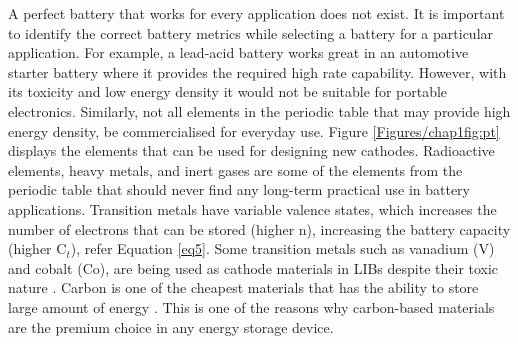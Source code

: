 A perfect battery that works for every application does not exist. It is important to identify the correct battery metrics while selecting a battery for a particular application. For example, a lead-acid battery works great in an automotive starter battery where it provides the required high rate capability. However, with its toxicity and low energy density it would not be suitable for portable electronics. Similarly, not all elements in the periodic table that may provide high energy density, be commercialised for everyday use. Figure \ref{Figures/chap1fig:pt} displays the elements that can be used for designing new cathodes. Radioactive elements, heavy metals, and inert gases are some of the elements from the periodic table that should never find any long-term practical use in battery applications. Transition metals have variable valence states, which increases the number of electrons that can be stored (higher n), increasing the battery capacity (higher C$_t$), refer Equation \ref{eq5}. Some transition metals such as vanadium (V) and cobalt (Co), are being used as cathode materials in LIBs despite their toxic nature \cite{cui_carbon/titanium_2010, qu_vanadium_2019, salunkhe_direct_2014, spreafico_pvdf_2014}. Carbon is one of the cheapest materials that has the ability to store large amount of energy \cite{candelaria_nanostructured_2012}. This is one of the reasons why carbon-based materials are the premium choice in any energy storage device.

